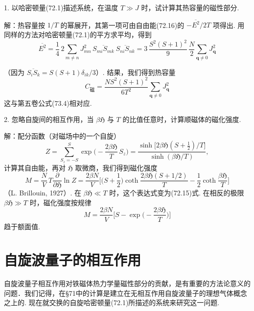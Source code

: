 \begin{xiti}

1. 以哈密顿量(72.1)描述系统，在温度 $T\gg J$ 时，试计算其热容量的磁性部分.

{\heiti 解：}热容量按 $1/T$ 的幂展开，其第一项可由自由能(72.16)的 $-\overline{\!E^2}/2T$ 项得出. 用同样的方法对哈密顿量(72.1)的平方求平均，得到
\begin{equation*}
\overline{\!E^2}=\frac{1}{4}\,2\sum_{m\neq n}J_{mn}^2\,
\overline{S_{mi}S_{mk}}\ \overline{S_{ni}S_{nk}}
=3\,\frac{S^2(S+1)^2}{9}\,\frac{N}{2}\sum_{\bm{q}\neq0}J_{\bm{q}}^2
\end{equation*}

（因为 $\overline{S_iS_k}=S(S+1)\delta_{ik}/3$）. 结果，我们得到热容量
\begin{equation*}
C_{\text{磁}}=\frac{NS^2(S+1)^2}{6T^2}\sum_{\bm{q}\neq0}J_{\bm{q}}^2
\end{equation*}
这与第五卷公式(73.4)相对应.

2. 忽略自旋间的相互作用，当 $\beta\mathfrak{H}$ 与 $T$ 的比值任意时，计算顺磁体的磁化强度.

{\heiti 解：}配分函数（对磁场中的一个自旋）
\begin{equation*}
Z=\sum_{S_z=-S}^{S}\exp\bigg(-\frac{2\beta\mathfrak{H}}{T}\,S_z\bigg)
=\frac{\sinh\big[2\beta\mathfrak{H}(S+\frac{1}{2})/T\big]}
{\sinh(\beta\mathfrak{H}/T)},
\end{equation*}
计算其自由能，再对 $\mathfrak{H}$ 取微商，我们得到磁化强度
\begin{equation*}
M=\frac{N}{V}\,T\frac{\partial}{\partial\mathfrak{H}}\ln Z
=\frac{2\beta N}{V}\biggl[\biggl(S+\frac{1}{2}\biggr)
\coth\frac{2\beta\mathfrak{H}(S+1/2)}{T}
-\frac{1}{2}\coth\frac{\beta\mathfrak{H}}{T}\biggr]
\end{equation*}
（L. Brillouin, 1927）. 在 $\beta\mathfrak{H}\ll T$ 时，这个表达式变为(72.15)式. 在相反的极限 $\beta\mathfrak{H}\gg T$ 时，磁化强度按规律
\begin{equation*}
M=\frac{2\beta N}{V}\biggl[S-\exp\biggl(-\frac{2\beta\mathfrak{H}}{T}\biggr)\biggr]
\end{equation*}
趋于额面值.

\end{xiti}

\section{自旋波量子的相互作用}

自旋波量子相互作用对铁磁体热力学量磁性部分的贡献，是有重要的方法论意义的问题．我们记得，在§71中的计算是建立在无相互作用自旋波量子的理想气体概念之上的. 现在就交换的自旋哈密顿量(72.1)所描述的系统来研究这一问题.

